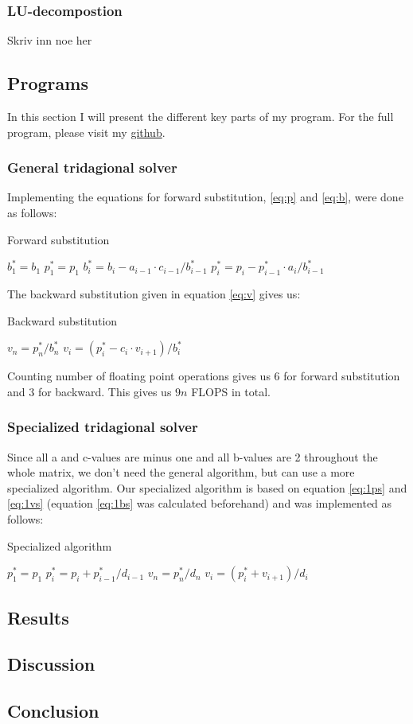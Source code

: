 \documentclass[12pt,a4paper]{article}
\newcommand{\s}{^{*}}
\newcommand{\husk}[1]{\color{red} #1 \color{black}}
\begin{document}
\subsubsection*{LU-decompostion}
\husk{Skriv inn noe her}
\subsection*{Programs}
In this section I will present the different key parts of my program. For the full program, please visit my  \href{https://github.com/scuper42/FYS4150/tree/master/project1}{github}.
\subsubsection*{General tridagional solver}
Implementing the equations for forward substitution, \eqref{eq:p} and \eqref{eq:b}, were done as follows: 
\begin{algorithm}[H]
\small
\caption{Forward substitution}\label{alg:tri_forward}
\begin{algorithmic}[1]
\State $b_1^* = b_1$
\State $p_1^* = p_1$
\State $b_i^* = b_i - a_{i-1}\cdot c_{i-1}/b_{i-1}^*$
\State $p_i^* = p_i - p_{i-1}^*\cdot a_i/b_{i-1}^*$
\EndFor
\end{algorithmic}
\end{algorithm}
The backward substitution given in equation \eqref{eq:v} gives us:
\begin{algorithm}[H]
\small
\caption{Backward substitution}\label{alg:tri_backward}
\begin{algorithmic}[1]
\State $v_n = p_n\s/b_n\s$
\State $v_i = (p_i\s - c_i \cdot v_{i+1})/b_i\s$
\EndFor
\end{algorithmic}
\end{algorithm}
Counting number of floating point operations gives us 6 for forward substitution and 3 for backward. This gives us $9n$ FLOPS in total.
\subsubsection*{Specialized tridagional solver}
Since all a and c-values are minus one and all b-values are 2 throughout the whole matrix, we don't need the general algorithm, but can use a more specialized algorithm. Our specialized algorithm is based on equation \eqref{eq:1ps} and \eqref{eq:1vs} (equation \eqref{eq:1bs} was calculated beforehand) and was implemented as follows:
\begin{algorithm}[H]
\small
\caption{Specialized algorithm}\label{alg:tri_special}
\begin{algorithmic}[1]
\State $p_1^* = p_1$
 
\State $p_i^* = p_i + p_{i-1}^*/d_{i-1}$
\EndFor
\State $v_n = p_n^*/d_n$
 
\State $v_i = (p_i^* + v_{i+1})/d_i$ 
\EndFor
\end{algorithmic}
\end{algorithm}
\subsection*{Results}
\subsection*{Discussion}
\subsection*{Conclusion}
\end{document}
